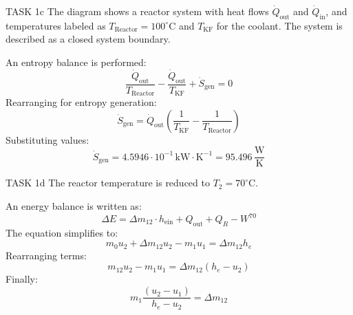 TASK 1c  
The diagram shows a reactor system with heat flows \( \dot{Q}_{\text{out}} \) and \( \dot{Q}_{\text{in}} \), and temperatures labeled as \( T_{\text{Reactor}} = 100^\circ\text{C} \) and \( T_{\text{KF}} \) for the coolant. The system is described as a closed system boundary.  

An entropy balance is performed:  
\[
\frac{\dot{Q}_{\text{out}}}{T_{\text{Reactor}}} - \frac{\dot{Q}_{\text{out}}}{T_{\text{KF}}} + \dot{S}_{\text{gen}} = 0
\]  
Rearranging for entropy generation:  
\[
\dot{S}_{\text{gen}} = \dot{Q}_{\text{out}} \left( \frac{1}{T_{\text{KF}}} - \frac{1}{T_{\text{Reactor}}} \right)
\]  
Substituting values:  
\[
\dot{S}_{\text{gen}} = 4.5946 \cdot 10^{-1} \, \text{kW} \cdot \text{K}^{-1} = 95.496 \, \frac{\text{W}}{\text{K}}
\]  

TASK 1d  
The reactor temperature is reduced to \( T_2 = 70^\circ\text{C} \).  

An energy balance is written as:  
\[
\Delta E = \Delta m_{12} \cdot h_{\text{ein}} + Q_{\text{out}} + Q_R - W^{70}
\]  
The equation simplifies to:  
\[
m_0 u_2 + \Delta m_{12} u_2 - m_1 u_1 = \Delta m_{12} h_e
\]  
Rearranging terms:  
\[
m_{12} u_2 - m_1 u_1 = \Delta m_{12} (h_e - u_2)
\]  
Finally:  
\[
m_1 \frac{(u_2 - u_1)}{h_e - u_2} = \Delta m_{12}
\]